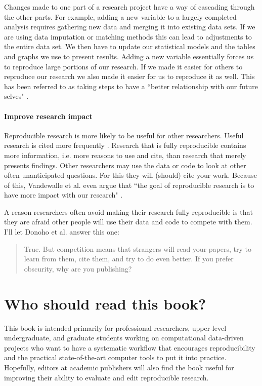 Changes made to one part of a research project have a way of cascading through the other parts. For example, adding a new variable to a largely completed analysis requires gathering new data and merging it into existing data sets. If we are using data imputation or matching methods this can lead to adjustments to the entire data set. We then have to update our statistical models and the tables and graphs we use to present results. Adding a new variable essentially forces us to reproduce large portions of our research. If we made it easier for others to reproduce our research we also made it easier for us to reproduce it as well. This has been referred to as taking steps to have a ``better relationship with our future selves" \cite[]{Bowers2011}.

\paragraph{Improve research impact}
Reproducible research is more likely to be useful for other researchers. Useful research is cited more frequently \cite[]{Vandewalle2012}. Research that is fully reproducible contains more information, i.e. more reasons to use and cite, than research that merely presents findings. Other researchers may use the data or code to look at other often unanticipated questions. For this they will (should) cite your work. Because of this, Vandewalle et al. even argue that ``the goal of reproducible research is to have more impact with our research"  \citeyearpar[1253]{Vandewalle2007}.


A reason researchers often avoid making their research fully reproducible is that they are afraid other people will use their data and code to compete with them. I'll let Donoho et al. answer this one:

\begin{quote}
    True. But competition means that strangers will read your papers, try to learn from them, cite them, and try to do even better. If you prefer obscurity, why are you publishing? \citeyearpar[16]{Donoho2009}
\end{quote}

\section{Who should read this book?}

This book is intended primarily for professional researchers, upper-level undergraduate, and graduate students  working on computational data-driven projects who want to have a systematic workflow that encourages reproducibility and the practical state-of-the-art computer tools to put it into practice. Hopefully, editors at academic publishers will also find the book useful for improving their ability to evaluate and edit reproducible research. 

